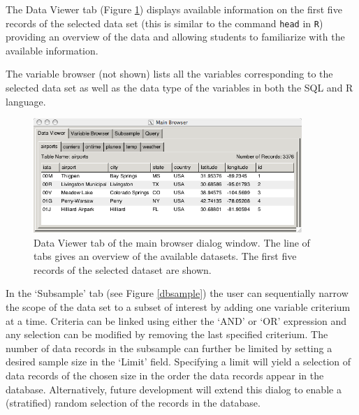 \documentclass[11pt]{tise_style}
\newcommand{\red}[1]{{\color{red} #1}}
\begin{document}

The Data Viewer tab  (Figure \ref{lineviewer}) displays available information on the first five records of the selected data set (this is similar to the command {\tt head} in {\tt R}) providing an overview of the data and allowing students to familiarize with the available information.  

The variable browser (not shown) lists all the variables corresponding to the selected data set as well as the data type of the variables in both the SQL and R language.  


\begin{figure}[h] %
   \centering
   \includegraphics[width=4in]{db-lineviewer.png} 
   \caption{Data Viewer tab of the main browser dialog window. The line of tabs gives an overview of the available datasets. The first five records of the selected  dataset are shown.}
   \label{lineviewer}
\end{figure}

In the `Subsample' tab (see Figure \ref{dbsample}) the user can sequentially narrow the scope of the data set to a subset of interest by adding one variable criterium at a time. Criteria can be linked using either the `AND' or `OR' expression and any selection can be modified by removing the last specified criterium. The number of data records in the subsample can further be limited by setting a desired sample size  in the  `Limit' field. Specifying a limit will yield a selection of data records of the chosen size in the order the data records appear in the database. Alternatively, future development will extend this dialog to enable a (stratified) random selection of the records in the database.
\end{document}
